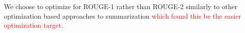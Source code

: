We choose to optimize for ROUGE-1 rather than 
ROUGE-2 similarly to other optimization based approaches to summarization 
\textcolor{red}{
\cite{durrett2016learning,sipos2012large,nallapati2017summarunner} which found this
be the easier optimization target.}



